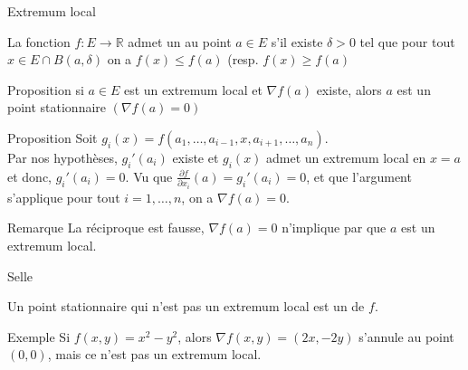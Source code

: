 \begin{parag}{Extremum local}
    \begin{definition}
    La fonction $f: E \to \mathbb{R}$ admet un  au point $a \in E $ s'il existe $\delta > 0$ tel que pour tout $x \in E \cap B\left(a, \delta\right)$ on a $f\left(x\right) \leq f\left(a\right)$ (resp. $f\left(x\right) \geq f\left(a\right)$
    \end{definition}
    \begin{subparag}{Proposition}
        si $a \in E$ est un extremum local et $\nabla f \left(a\right)$ existe, alors $a$ est un point stationnaire $\left(\nabla f\left(a\right) = 0\right)$
        
    \end{subparag}
    \begin{subparag}{Proposition}
        Soit $g_i\left(x\right) = f\left(a_1, \ldots, a_{i-1}, x, a_{i+1}, \ldots, a_n\right)$.\\
        Par nos hypothèses, $g_i'\left(a_i\right)$ existe et $g_i\left(x\right)$ admet un extremum local en $x = a$ et donc, $g_i'\left(a_i\right) = 0$. Vu que $\frac{\partial f}{\partial x_i}\left(a\right) = g_i'\left(a_i\right) = 0$, et que l'argument s'applique pour tout $i = 1, \ldots, n$, on a  $\nabla f\left(a\right) = 0$.
    \end{subparag}
    \begin{subparag}{Remarque}
        La réciproque est fausse, $\nabla f\left(a\right) = 0$ n'implique par que $a$ est un extremum local.
    \end{subparag}
\end{parag}

\begin{parag}{Selle}
    \begin{definition}
    Un point stationnaire qui n'est pas un extremum local est un  de $f$.
    \end{definition}
    
    \begin{subparag}{Exemple}
        Si $f\left(x, y\right) = x^2 - y^2$, alors $\nabla f\left(x, y\right) = \left(2x, -2y\right)$ s'annule au point $\left(0, 0\right)$, mais ce n'est pas un extremum local.
    \end{subparag}
\end{parag}
        
